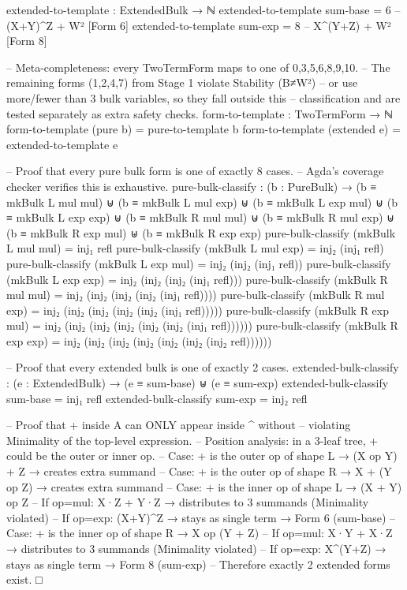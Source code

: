 \documentclass[11pt,a4paper]{article}
\begin{document}
\begin{code}
extended-to-template : ExtendedBulk → ℕ
extended-to-template sum-base = 6           -- (X+Y)^Z + W²  [Form 6]
extended-to-template sum-exp  = 8           -- X^(Y+Z) + W²  [Form 8]

-- Meta-completeness: every TwoTermForm maps to one of {0,3,5,6,8,9,10}.
-- The remaining forms (1,2,4,7) from Stage 1 violate Stability (B≠W²)
-- or use more/fewer than 3 bulk variables, so they fall outside this
-- classification and are tested separately as extra safety checks.
form-to-template : TwoTermForm → ℕ
form-to-template (pure b)     = pure-to-template b
form-to-template (extended e) = extended-to-template e

-- Proof that every pure bulk form is one of exactly 8 cases.
-- Agda's coverage checker verifies this is exhaustive.
pure-bulk-classify : (b : PureBulk) →
  (b ≡ mkBulk L mul mul) ⊎ (b ≡ mkBulk L mul exp) ⊎
  (b ≡ mkBulk L exp mul) ⊎ (b ≡ mkBulk L exp exp) ⊎
  (b ≡ mkBulk R mul mul) ⊎ (b ≡ mkBulk R mul exp) ⊎
  (b ≡ mkBulk R exp mul) ⊎ (b ≡ mkBulk R exp exp)
pure-bulk-classify (mkBulk L mul mul) = inj₁ refl
pure-bulk-classify (mkBulk L mul exp) = inj₂ (inj₁ refl)
pure-bulk-classify (mkBulk L exp mul) = inj₂ (inj₂ (inj₁ refl))
pure-bulk-classify (mkBulk L exp exp) = inj₂ (inj₂ (inj₂ (inj₁ refl)))
pure-bulk-classify (mkBulk R mul mul) = inj₂ (inj₂ (inj₂ (inj₂ (inj₁ refl))))
pure-bulk-classify (mkBulk R mul exp) = inj₂ (inj₂ (inj₂ (inj₂ (inj₂ (inj₁ refl)))))
pure-bulk-classify (mkBulk R exp mul) = inj₂ (inj₂ (inj₂ (inj₂ (inj₂ (inj₂ (inj₁ refl))))))
pure-bulk-classify (mkBulk R exp exp) = inj₂ (inj₂ (inj₂ (inj₂ (inj₂ (inj₂ (inj₂ refl))))))

-- Proof that every extended bulk is one of exactly 2 cases.
extended-bulk-classify : (e : ExtendedBulk) →
  (e ≡ sum-base) ⊎ (e ≡ sum-exp)
extended-bulk-classify sum-base = inj₁ refl
extended-bulk-classify sum-exp  = inj₂ refl

-- Proof that + inside A can ONLY appear inside ^ without
-- violating Minimality of the top-level expression.
-- Position analysis: in a 3-leaf tree, + could be the outer or inner op.
-- Case: + is the outer op of shape L → (X op Y) + Z → creates extra summand
-- Case: + is the outer op of shape R → X + (Y op Z) → creates extra summand
-- Case: + is the inner op of shape L → (X + Y) op Z
--   If op=mul: X·Z + Y·Z → distributes to 3 summands (Minimality violated)
--   If op=exp: (X+Y)^Z → stays as single term → Form 6 (sum-base)
-- Case: + is the inner op of shape R → X op (Y + Z)
--   If op=mul: X·Y + X·Z → distributes to 3 summands (Minimality violated)
--   If op=exp: X^(Y+Z) → stays as single term → Form 8 (sum-exp)
-- Therefore exactly 2 extended forms exist.  □


\end{code}
\end{document}
